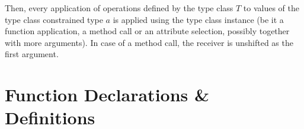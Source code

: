 Then, every application of operations defined by the type class $T$ to values of the type class constrained type $a$ is applied using the type class instance (be it a function application, a method call or an attribute selection, possibly together with more arguments). In case of a method call, the receiver is unshifted as the first argument.  





\newpage

\section{Function Declarations \& Definitions}
\label{sec:function-decls-defs}


